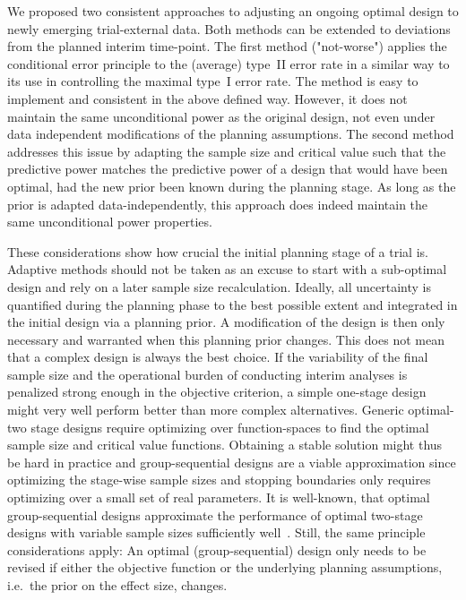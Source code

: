 \documentclass[12pt]{article}
\begin{document}
We proposed two consistent approaches to adjusting an ongoing optimal design to
newly emerging trial-external data.
Both methods can be extended to deviations from the planned interim time-point.
The first method ("not-worse") applies the conditional error principle to the (average) type~II error rate in a similar way to its use in controlling the maximal type~I error rate.
The method is easy to implement and consistent in the above defined way.
However, it does not maintain the same unconditional power as the original design,
not even under data independent modifications of the planning assumptions.
The second method addresses this issue by adapting the sample size and critical value such that the predictive power matches the predictive power of a design that would have been optimal, had the new prior been known during the planning stage.
As long as the prior is adapted data-independently, this approach does indeed maintain the same unconditional power properties.

These considerations show how crucial the initial planning stage of a trial is.
Adaptive methods should not be taken as an excuse to start with a
sub-optimal design and rely on a later sample size recalculation.
Ideally, all uncertainty is quantified during the planning phase to
the best possible extent and integrated in the initial design via a
planning prior.
A modification of the design is then only necessary and warranted
when this planning prior changes.
This does not mean that a complex design is always the best choice.
If the variability of the final sample size and the operational
burden of conducting interim analyses is penalized strong enough in
the objective criterion, a simple one-stage design might very well
perform better than more complex alternatives.
Generic optimal-two stage designs require optimizing over function-spaces to find the optimal sample size and critical value functions.
Obtaining a stable solution might thus be hard in practice and
group-sequential designs are a viable approximation since optimizing the stage-wise sample sizes and stopping boundaries only requires optimizing over a small set of real parameters.
It is well-known, that optimal group-sequential designs approximate the performance of optimal two-stage designs with variable sample sizes sufficiently well~\cite{wassmer2016}.
Still, the same principle considerations apply:
An optimal (group-sequential) design only needs to be revised if either the objective function or the underlying planning assumptions, i.e.~the prior on the effect size, changes.
\end{document}
